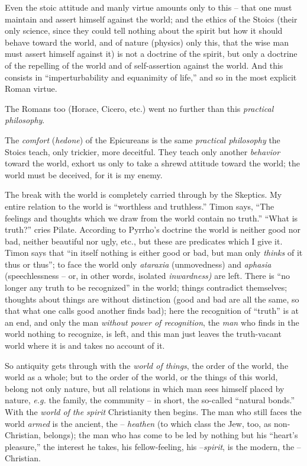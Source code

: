 \documentclass[12pt,a4paper]{book}
\begin{document}
Even the stoic attitude and manly virtue amounts only to this -- that one must 
maintain and assert himself against the world; and the ethics of the Stoics 
(their only science, since they could tell nothing about the spirit but how it 
should behave toward the world, and of nature (physics) only this, that the 
wise man must assert himself against it) is not a doctrine of the spirit, but 
only a doctrine of the repelling of the world and of self-assertion against 
the world. And this consists in ``imperturbability and equanimity of life,'' 
and so in the most explicit Roman virtue.

The Romans too (Horace, Cicero, etc.) went no further than this 
\textit{practical philosophy}.

The \textit{comfort} (\textit{hedone}) of the Epicureans is the same 
\textit{practical philosophy} the Stoics teach, only trickier, more deceitful. 
They teach only another \textit{behavior} toward the world, exhort us only to 
take a shrewd attitude toward the world; the world must be deceived, for it is 
my enemy.

The break with the world is completely carried through by the Skeptics. My 
entire relation to the world is ``worthless and truthless.'' Timon says, 
``The feelings and thoughts which we draw from the world contain no truth.'' 
``What is truth?'' cries Pilate. According to Pyrrho's doctrine the world is 
neither good nor bad, neither beautiful nor ugly, etc., but these are 
predicates which I give it. Timon says that ``in itself nothing is either 
good or bad, but man only \textit{thinks} of it thus or thus''; to face the 
world only \textit{ataraxia} (unmovedness) and \textit{aphasia} 
(speechlessness -- or, in other words, isolated \textit{inwardness)} are left. 
There is ``no longer any truth to be recognized'' in the world; things 
contradict themselves; thoughts about things are without distinction (good and 
bad are all the same, so that what one calls good another finds bad); here the 
recognition of ``truth'' is at an end, and only the man \textit{without 
power of recognition}, the \textit{man} who finds in the world nothing to 
recognize, is left, and this man just leaves the truth-vacant world where it 
is and takes no account of it.

So antiquity gets through with the \textit{world of things}, the order of the 
world, the world as a whole; but to the order of the world, or the things of 
this world, belong not only nature, but all relations in which man sees 
himself placed by nature, \textit{e.g.} the family, the community -- in 
short, the so-called ``natural bonds.'' With the \textit{world of the 
spirit} Christianity then begins. The man who still faces the world 
\textit{armed} is the ancient, the -- \textit{heathen} (to which class the 
Jew, too, as non-Christian, belongs); the man who has come to be led by 
nothing but his ``heart's pleasure,'' the interest he takes, his 
fellow-feeling, his --\textit{spirit}, is the modern, the -- Christian.
\end{document}
